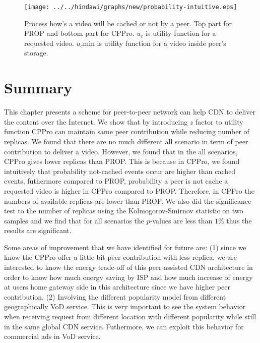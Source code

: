 \begin{figure}[!t]
\begin{center}
\texttt{[image: ../../hindawi/graphs/new/probability-intuitive.eps]}
\end{center}
\caption{Process how's a video will be cached or not by a peer. Top part for PROP and bottom part for CPPro. 
$u_r$ is utility function for a requested video.  
$u_c$min is utility function for a video inside peer's storage.
}
\label{fig:cached-notcached}
\end{figure} 




\section{Summary}
This chapter presents a scheme for peer-to-peer network can help CDN to deliver the content over the Internet. 
We show that by introducing $z$ factor to utility function CPPro can maintain same peer contribution while reducing number of replicas.
We found that there are no much different all scenario in term of peer contribution to deliver a video. 
However, we found that in the all scenarios, CPPro gives lower replicas than PROP. 
This is because in CPPro, we found intuitively that probability not-cached events occur are higher than cached events, futhermore compared to PROP, probability a peer is not cache a requested video is higher in CPPro compared to PROP.
Therefore, in CPPro the numbers of available replicas are lower than PROP. 
We also did the significance test to the number of replicas using the Kolmogorov-Smirnov statistic on two samples and we find that for all scenarios the $p$-values are less than $1$\% thus the results are significant. 

Some areas of improvement that we have identified for future are: (1) since we know the CPPro offer a little bit peer contribution with less replica, we are interested to know the energy trade-off of this peer-assisted CDN architecture in order to know how much energy saving by ISP and how much increase of energy at users home gateway side in this architecture since we have higher peer contribution.   
(2) Involving the different popularity model from different geographically VoD service.
This is very important to see the system behavior when receiving request from different location with different popularity while still in the same global CDN service. 
Futhermore, we can exploit this behavior for commercial ads in VoD service.